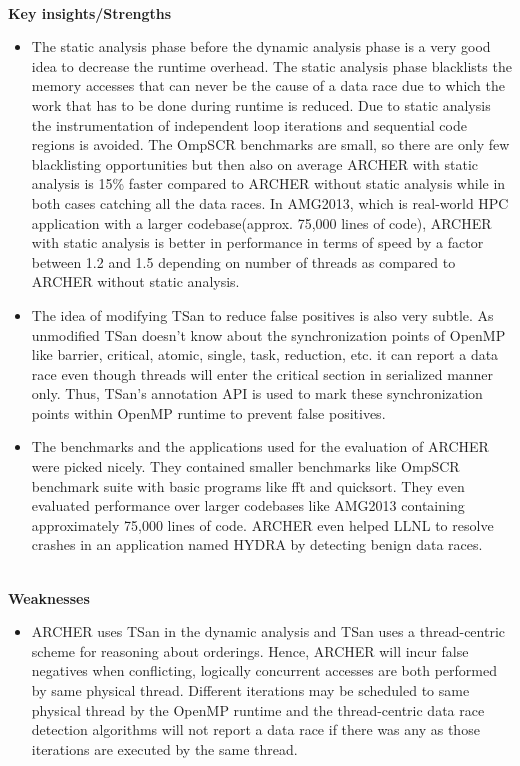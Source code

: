 \documentclass[20pt]{letter}
\begin{document}
\begin{enumerate}
{\textbf{\\Key insights/Strengths}\\
\begin{itemize}
    \item The static analysis phase before the dynamic analysis phase is a very good idea to decrease the runtime overhead. The static analysis phase blacklists the memory accesses that can never be the cause of a data race due to which the work that has to be done during runtime is reduced. Due to static analysis the instrumentation of independent loop iterations and sequential code regions is avoided. The OmpSCR benchmarks are small, so there are only few blacklisting opportunities but then also on average ARCHER with static analysis is 15\% faster compared to ARCHER without static analysis while in both cases catching all the data races. In AMG2013, which is real-world HPC application with a larger codebase(approx. 75,000 lines of code), ARCHER with static analysis is better in performance in terms of speed by a factor between 1.2 and 1.5 depending on number of threads as compared to ARCHER without static analysis.\\

    \item The idea of modifying TSan to reduce false positives is also very subtle. As unmodified TSan doesn't know about the synchronization points of OpenMP like barrier, critical, atomic, single, task, reduction, etc. it can report a data race even though threads will enter the critical section in serialized manner only. Thus, TSan's annotation API is used to mark these synchronization points within OpenMP runtime to prevent false positives.\\

    \item The benchmarks and the applications used for the evaluation of ARCHER were picked nicely. They contained smaller benchmarks like OmpSCR benchmark suite with basic programs like fft and quicksort. They even evaluated performance over larger codebases like AMG2013 containing approximately 75,000 lines of code. ARCHER even helped LLNL to resolve crashes in an application named HYDRA by detecting benign data races.
\end{itemize}

\textbf{\\Weaknesses}\\
\begin{itemize}
    \item ARCHER uses TSan in the dynamic analysis and TSan uses a thread-centric scheme for reasoning about orderings. Hence, ARCHER will incur false negatives when conflicting, logically concurrent accesses are both performed by same physical thread. Different iterations may be scheduled to same physical thread by the OpenMP runtime and the thread-centric data race detection algorithms will not report a data race if there was any as those iterations are executed by the same thread.\\


\end{itemize}}
\end{enumerate}
\end{document}
